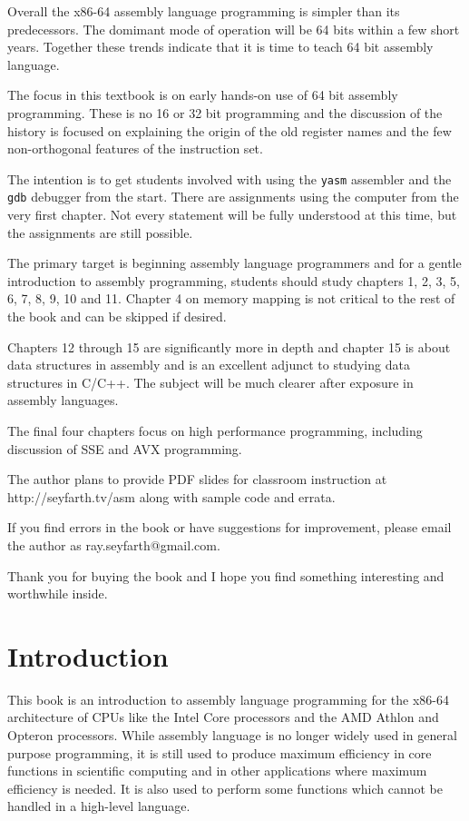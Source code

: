 \documentclass[11pt,b5paper]{book}
\begin{document}
Overall the x86-64 assembly language programming is simpler than its predecessors.
The domimant mode of operation will be 64 bits within a few short years.
Together these trends indicate that it is time to teach 64 bit assembly
language.

The focus in this textbook is on early hands-on use of 64 bit assembly programming.
These is no 16 or 32 bit programming and the discussion of the history
is focused on explaining the origin of the old register names and the
few non-orthogonal features of the instruction set.

The intention is to get students involved with using
the {\tt yasm} assembler and the {\tt gdb} debugger from the start.
There are assignments using the computer from the very first chapter.
Not every statement will be fully understood at this time, but the assignments
are still possible.

The primary target is beginning assembly language programmers and
for a gentle introduction to assembly programming, students should study
chapters 1, 2, 3, 5, 6, 7, 8, 9, 10 and 11.
Chapter 4 on memory mapping is not critical to the rest of the book and
can be skipped if desired.

Chapters 12 through 15 are significantly more in depth and
chapter 15 is about data structures in assembly and is an excellent adjunct
to studying data structures in C/C++.
The subject will be much clearer after exposure in assembly languages.

The final four chapters focus on high performance programming, including
discussion of SSE and AVX programming.

The author plans to provide PDF slides for classroom instruction
at http://seyfarth.tv/asm along with sample code and errata.

If you find errors in the book or have suggestions for improvement,
please email the author as ray.seyfarth@gmail.com.

Thank you for buying the book and I hope you find something interesting
and worthwhile inside.

 
\tableofcontents

\mainmatter

\chapter{Introduction}

This book is an introduction to assembly language programming for the x86-64
architecture of CPUs like the Intel Core processors and the AMD Athlon and
Opteron processors.
While assembly language is no longer widely used in general purpose programming,
it is still
used to produce maximum efficiency in core functions in scientific computing and in other applications where maximum efficiency is needed.
It is also used to perform some functions which cannot be handled in a
high-level language.
\end{document}
